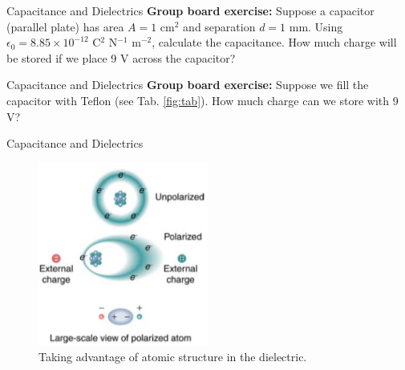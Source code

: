 \documentclass{beamer}
\begin{document}
\begin{frame}{Capacitance and Dielectrics}
\textbf{Group board exercise:} Suppose a capacitor (parallel plate) has area $A = 1$ cm$^2$ and separation $d = 1$ mm.  Using $\epsilon_0 = 8.85 \times 10^{-12}$ C$^2$ N$^{-1}$ m$^{-2}$, calculate the capacitance.  How much charge will be stored if we place 9 V across the capacitor?
\end{frame}

\begin{frame}{Capacitance and Dielectrics}
\textbf{Group board exercise:} Suppose we fill the capacitor with Teflon (see Tab. \ref{fig:tab}).  How much charge can we store with 9 V?
\end{frame}

\begin{frame}{Capacitance and Dielectrics}
\begin{figure}
\centering
\includegraphics[width=0.5\textwidth]{figures/polar2.png}
\caption{\label{fig:polar2} Taking advantage of atomic structure in the dielectric.}
\end{figure}
\end{frame}
\end{document}
